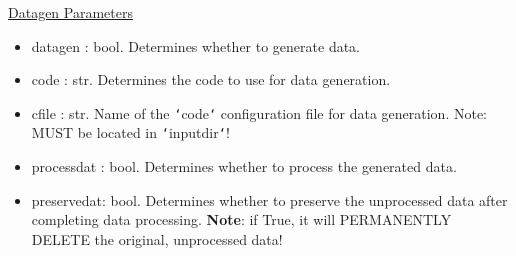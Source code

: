 \documentclass[letterpaper, 12pt]{article}
\begin{document}
\noindent \underline{Datagen Parameters}
\begin{itemize}
\item datagen    : bool. Determines whether to generate data.
\item code       : str.  Determines the code to use for data generation.
\item cfile      : str.  Name of the \texttt{`}code\texttt{`} configuration 
                         file for data generation.
                   Note: MUST be located in \texttt{`}inputdir\texttt{`}!
\item processdat : bool. Determines whether to process the generated data.
\item preservedat: bool. Determines whether to preserve the unprocessed data 
                         after completing data processing.
                   \textbf{Note}: if True, it will PERMANENTLY DELETE the 
                          original, unprocessed data!
\end{itemize}
\end{document}
